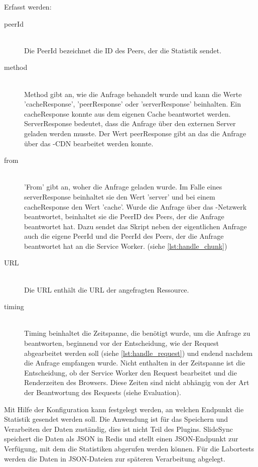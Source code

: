 Erfasst werden:
\begin{description}
\item[peerId]\hfill \\
Die PeerId bezeichnet die ID des Peers, der die Statistik sendet.
\item[method]\hfill \\
Method gibt an, wie die Anfrage behandelt wurde und kann die Werte 'cacheResponse', 'peerResponse' oder 'serverResponse' beinhalten. Ein cacheResponse konnte aus dem eigenen Cache beantwortet werden. ServerResponse bedeutet, dass die Anfrage über den externen Server geladen werden musste. Der Wert peerResponse gibt an das die Anfrage über das \pTp-CDN bearbeitet werden konnte.
\item[from]\hfill \\
 'From' gibt an, woher die Anfrage geladen wurde. Im Falle eines serverResponse beinhaltet sie den Wert 'server' und bei einem cacheResponse den Wert 'cache'. Wurde die Anfrage über das \pTp-Netzwerk beantwortet, beinhaltet sie die PeerID des Peers, der die Anfrage beantwortet hat. Dazu sendet das Skript neben der eigentlichen Anfrage auch die eigene PeerId und die PeerId des Peers, der die Anfrage beantwortet hat an die Service Worker. (siehe \ref{lst:handle_chunk}) 
\item[URL]\hfill \\
Die URL enthält die URL der angefragten Ressource. 
\item[timing]\hfill \\
Timing beinhaltet die Zeitspanne, die benötigt wurde, um die Anfrage zu beantworten, beginnend vor der Entscheidung, wie der Request abgearbeitet werden soll (siehe \ref{lst:handle_request}) und endend nachdem die Anfrage empfangen wurde. Nicht enthalten in der Zeitspanne ist die Entscheidung, ob der Service Worker den Request bearbeitet und die Renderzeiten des Browsers. Diese Zeiten sind nicht abhängig von der Art der Beantwortung des Requests (siehe Evaluation).
\end{description}
Mit Hilfe der Konfiguration kann festgelegt werden, an welchen Endpunkt die Statistik gesendet werden soll. Die Anwendung ist für das Speichern und Verarbeiten der Daten zuständig, dies ist nicht Teil des Plugins. SlideSync speichert die Daten als JSON in Redis und stellt einen JSON-Endpunkt zur Verfügung, mit dem die Statistiken abgerufen werden können. Für die Labortests werden die Daten in JSON-Dateien zur späteren Verarbeitung abgelegt.




